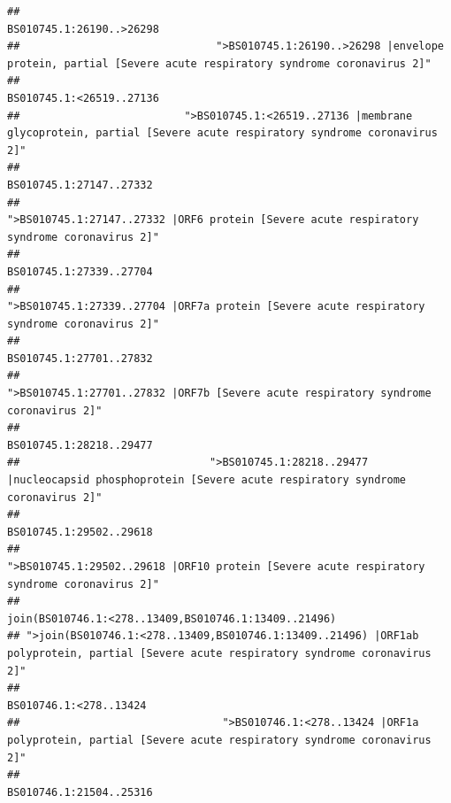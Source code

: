 \documentclass[
]{article}
\begin{document}
\begin{verbatim}
##                                                                                                               BS010745.1:26190..>26298 
##                               ">BS010745.1:26190..>26298 |envelope protein, partial [Severe acute respiratory syndrome coronavirus 2]" 
##                                                                                                               BS010745.1:<26519..27136 
##                          ">BS010745.1:<26519..27136 |membrane glycoprotein, partial [Severe acute respiratory syndrome coronavirus 2]" 
##                                                                                                                BS010745.1:27147..27332 
##                                             ">BS010745.1:27147..27332 |ORF6 protein [Severe acute respiratory syndrome coronavirus 2]" 
##                                                                                                                BS010745.1:27339..27704 
##                                            ">BS010745.1:27339..27704 |ORF7a protein [Severe acute respiratory syndrome coronavirus 2]" 
##                                                                                                                BS010745.1:27701..27832 
##                                                    ">BS010745.1:27701..27832 |ORF7b [Severe acute respiratory syndrome coronavirus 2]" 
##                                                                                                                BS010745.1:28218..29477 
##                              ">BS010745.1:28218..29477 |nucleocapsid phosphoprotein [Severe acute respiratory syndrome coronavirus 2]" 
##                                                                                                                BS010745.1:29502..29618 
##                                            ">BS010745.1:29502..29618 |ORF10 protein [Severe acute respiratory syndrome coronavirus 2]" 
##                                                                                   join(BS010746.1:<278..13409,BS010746.1:13409..21496) 
## ">join(BS010746.1:<278..13409,BS010746.1:13409..21496) |ORF1ab polyprotein, partial [Severe acute respiratory syndrome coronavirus 2]" 
##                                                                                                                 BS010746.1:<278..13424 
##                                ">BS010746.1:<278..13424 |ORF1a polyprotein, partial [Severe acute respiratory syndrome coronavirus 2]" 
##                                                                                                                BS010746.1:21504..25316 

\end{verbatim}
\end{document}
